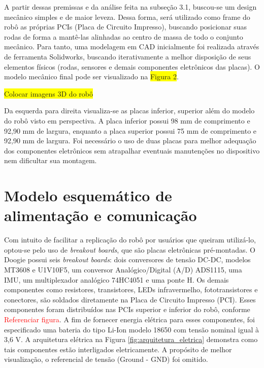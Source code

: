 A partir dessas premissas e da análise feita na subseção 3.1, buscou-se um design mecânico simples e de maior leveza. Dessa forma, será utilizado como frame do robô as próprias PCIs (Placa de Circuito Impresso), buscando posicionar suas rodas de forma a mantê-las alinhadas ao centro de massa de todo o conjunto mecânico. Para tanto, uma modelagem em CAD inicialmente foi realizada através de ferramenta Solidworks, buscando iterativamente a melhor disposição de seus elementos físicos (rodas, sensores e demais componentes eletrônicos das placas).  O modelo mecânico final pode ser visualizado na \colorbox{yellow}{Figura  2}.

\colorbox{yellow}{Colocar imagens 3D do robô}

Da esquerda para direita visualiza-se as placas inferior, superior além do modelo do robô visto em perspectiva. A placa inferior possui 98 mm de comprimento e 92,90 mm de largura, enquanto a placa superior possui 75 mm de comprimento e 92,90 mm de largura. Foi necessário o uso de duas placas para melhor adequação dos componentes eletrônicos sem atrapalhar eventuais manutenções no dispositivo nem dificultar sua montagem.

\section{Modelo esquemático de alimentação e comunicação}
\label{sec:modesq}
Com intuito de facilitar a replicação do robô por usuários que queiram utilizá-lo, optou-se pelo uso de \textit{breakout boards}, que são placas eletrônicas pré-montadas. O Doogie possui seis \textit{breakout boards}: dois conversores de tensão DC-DC, modelos MT3608 e U1V10F5, um conversor Analógico/Digital (A/D) ADS1115, uma IMU, um multiplexador analógico 74HC4051  e uma ponte H. Os demais componentes como resistores, transistores, LEDs infravermelho, fototransistores e conectores, são soldados diretamente na Placa de Circuito Impresso (PCI). Esses componentes foram distribuídos nas PCIs superior e inferior do robô, conforme \textcolor{red}{Referenciar figura}. A fim de fornecer energia elétrica para esses componentes, foi especificado uma bateria do tipo Li-Ion modelo 18650 com tensão nominal igual à 3,6 V. A arquitetura elétrica na Figura \ref{fig:arquitetura_eletrica} demonstra como tais componentes estão interligados eletricamente. A propósito de melhor visualização, o referencial de tensão (Ground - GND) foi omitido.

